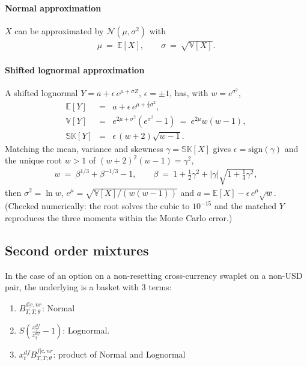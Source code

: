 \documentclass[11pt,english]{amsart}
\newcommand{\EE}{\mathbb{E}}
\newcommand{\VV}{\mathbb{V}}
\theoremstyle{definition}
\begin{document}
\paragraph{Normal approximation}
$X$ can be approximated by $\mathcal{N}(\mu,\sigma^2)$ with
\begin{eqnarray}
  \mu ~=~ \EE[X] , \qquad \sigma ~=~ \sqrt{\VV[X]} .
\end{eqnarray}

\paragraph{Shifted lognormal approximation}
A shifted lognormal $Y = a + \epsilon\, e^{\mu + \sigma Z}$, $\epsilon = \pm1$, has, with $w = e^{\sigma^2}$,
\begin{eqnarray}
  \EE[Y] &=& a + \epsilon\, e^{\mu + \frac{1}{2}\sigma^2} , \\
  \VV[Y]  &=& e^{2\mu + \sigma^2}\left(e^{\sigma^2}-1\right) ~=~ e^{2\mu}w(w-1) , \\
  \mathbb{SK}[Y]  &=& \epsilon\,(w+2)\sqrt{w-1} .
\end{eqnarray}
Matching the mean, variance and skewness $\gamma = \mathbb{SK}[X]$ gives $\epsilon = \mathrm{sign}(\gamma)$ and the unique root $w > 1$ of $(w+2)^2(w-1) = \gamma^2$,
\begin{eqnarray*}
  w ~=~ \beta^{1/3} + \beta^{-1/3} - 1 , \qquad \beta ~=~ 1 + \tfrac12\gamma^2 + |\gamma|\sqrt{1 + \tfrac14\gamma^2} ,
\end{eqnarray*}
then $\sigma^2 = \ln w$, $e^{\mu} = \sqrt{\VV[X]/(w(w-1))}$ and $a = \EE[X] - \epsilon\, e^{\mu}\sqrt{w}$. (Checked numerically: the root solves the cubic to $10^{-15}$ and the matched $Y$ reproduces the three moments within the Monte Carlo error.)



\subsection{Second order mixtures}

In the case of an option on a non-resetting cross-currency swaplet on a non-USD pair, the underlying is a basket with 3 terms:
\begin{enumerate}
\item $B^{d|c,nr}_{T,T;\theta}$: Normal 
\item $S\left(\frac{x^{df}_{T}}{x^{df}_{t}} - 1\right)$: Lognormal.
\item $x^{df}_{t}B^{f|c,nr}_{T,T;\theta}$: product of Normal and Lognormal
\end{enumerate}
\end{document}
